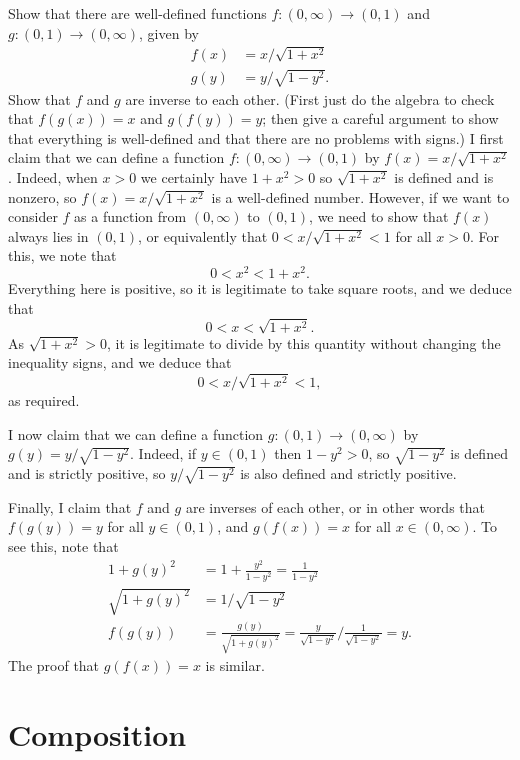 \documentclass[a4paper]{book}
\newcommand{\xra}       {\xrightarrow}
\renewcommand{\:}{\colon}
\theoremstyle{definition}
\newenvironment{starex}{
 \renewcommand{\thetheorem}{\arabic{chapter}.\arabic{section}.\arabic{theorem}${}^*$}
 \exercise
}{\endexercise}
\renewenvironment{solution}{\SolutionInline}{\endSolutionInline}
\begin{document}
\begin{starex}
 Show that there are well-defined functions $f\:(0,\infty)\xra{}(0,1)$
 and $g\:(0,1)\xra{}(0,\infty)$, given by
 \begin{align*}
  f(x) &= x/\sqrt{1+x^2} \\
  g(y) &= y/\sqrt{1-y^2}.
 \end{align*}
 Show that $f$ and $g$ are inverse to each other.  (First just do the
 algebra to check that $f(g(x))=x$ and $g(f(y))=y$; then give a
 careful argument to show that everything is well-defined and that
 there are no problems with signs.)
\end{starex}
\begin{solution}
 I first claim that we can define a function
 $f\:(0,\infty)\xra{}(0,1)$ by $f(x)=x/\sqrt{1+x^2}$.  Indeed, when
 $x>0$ we certainly have $1+x^2>0$ so $\sqrt{1+x^2}$ is defined and is
 nonzero, so $f(x)=x/\sqrt{1+x^2}$ is a well-defined number.  However,
 if we want to consider $f$ as a function from $(0,\infty)$ to
 $(0,1)$, we need to show that $f(x)$ always lies in $(0,1)$, or
 equivalently that $0<x/\sqrt{1+x^2}<1$ for all $x>0$.  For this, we
 note that
 \[ 0< x^2 < 1+x^2. \]
 Everything here is positive, so it is legitimate to take square
 roots, and we deduce that
 \[ 0< x < \sqrt{1+x^2}. \]
 As $\sqrt{1+x^2}>0$, it is legitimate to divide by this quantity
 without changing the inequality signs, and we deduce that
 \[ 0 < x/\sqrt{1+x^2} < 1, \]
 as required.

 I now claim that we can define a function $g\:(0,1)\xra{}(0,\infty)$
 by $g(y)=y/\sqrt{1-y^2}$.  Indeed, if $y\in(0,1)$ then $1-y^2>0$, so
 $\sqrt{1-y^2}$ is defined and is strictly positive, so
 $y/\sqrt{1-y^2}$ is also defined and strictly positive.

 Finally, I claim that $f$ and $g$ are inverses of each other, or in
 other words that $f(g(y))=y$ for all $y\in(0,1)$, and $g(f(x))=x$ for
 all $x\in(0,\infty)$.  To see this, note that
 \begin{align*}
  1 + g(y)^2 &= 1 + \frac{y^2}{1-y^2} = \frac{1}{1-y^2} \\
  \sqrt{1+g(y)^2} &= 1/\sqrt{1-y^2} \\
  f(g(y)) &= \frac{g(y)}{\sqrt{1+g(y)^2}}
           = \frac{y}{\sqrt{1-y^2}}/ \frac{1}{\sqrt{1-y^2}} = y.
 \end{align*}
 The proof that $g(f(x))=x$ is similar.
\end{solution}


\section{Composition}
\label{sec-composition}
\end{document}
